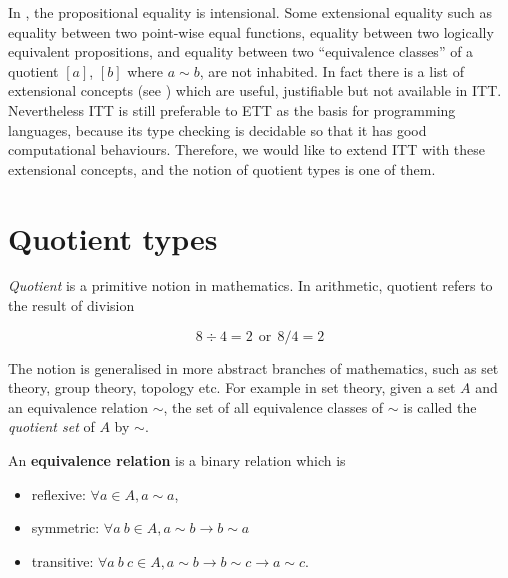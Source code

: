 In \itt, the propositional equality is intensional. Some extensional equality such as equality between two point-wise equal functions, equality between two logically equivalent propositions, and equality between two ``equivalence classes'' of a quotient $[a]$, $[b]$ where $a \sim b$, are not inhabited.
In fact there is a list of extensional concepts (see ) which are useful, justifiable but not available in ITT.
Nevertheless ITT is still preferable to ETT as the basis for programming languages, because its type checking is decidable so that it has good computational behaviours.
Therefore, we would like to extend ITT with these extensional concepts, and the notion of quotient types is one of them. 





\section{Quotient types}


\emph{Quotient} is a primitive notion in mathematics. In arithmetic, quotient refers to the result of division

$$8 \div 4 = 2 ~~ \text{or}~~ 8/4 = 2$$

The notion is generalised in more abstract branches of mathematics, such as set theory, group theory, topology etc. For example in set theory, given a set $A$ and an equivalence relation $\sim$, the set of all equivalence classes of $\sim$ is called the \emph{quotient set} of $A$ by $\sim$.

An \textbf{equivalence relation} is a binary relation which is 

\begin{itemize}
\item reflexive: $\forall a \in A, a \sim a$,
\item symmetric: $\forall a~ b \in A, a \sim b \to b \sim a$
\item transitive: $\forall a ~ b~ c \in A, a \sim b \to b \sim c \to a \sim c$.
\end{itemize}

